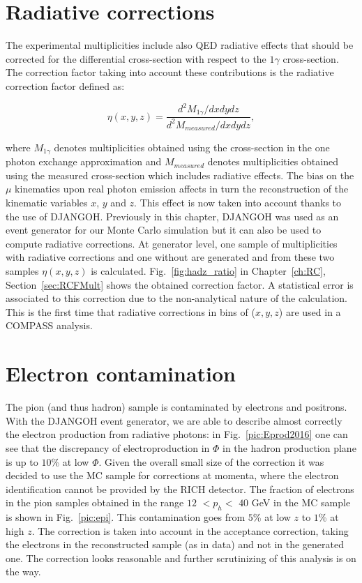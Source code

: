\section{Radiative corrections} \label{sec:rcf}

The experimental multiplicities include also QED radiative effects that should be corrected for the differential cross-section with respect to the $1\gamma$ cross-section. The correction factor taking into account these contributions is the radiative correction factor defined as:

\begin{equation}
	\eta(x,y,z) = \frac{d^2 M_{1\gamma}/dxdydz}{d^2 M_{measured}/dxdydz},
\end{equation}

where $M_{1\gamma}$ denotes multiplicities obtained using the cross-section in the one photon exchange approximation and $M_{measured}$ denotes multiplicities obtained using the measured cross-section which includes radiative effects. The bias on the $\mu$ kinematics upon real photon emission affects in turn the reconstruction of the kinematic variables $x$, $y$ and $z$. This effect is now taken into account thanks to the use of DJANGOH. Previously in this chapter, DJANGOH was used as an event generator for our Monte Carlo simulation but it can also be used to compute radiative corrections. At generator level, one sample of multiplicities with radiative corrections and one without are generated and from these two samples $\eta(x,y,z)$ is calculated. Fig.~\ref{fig:hadz_ratio} in Chapter~\ref{ch:RC}, Section~\ref{sec:RCFMult} shows the obtained correction factor. A statistical error is associated to this correction due to the non-analytical nature of the calculation. This is the first time that radiative corrections in bins of ($x,y,z$) are used in a COMPASS analysis.

\section{Electron contamination}

The pion (and thus hadron) sample is contaminated by electrons and positrons. With the DJANGOH event generator, we are able to describe almost correctly the electron production from radiative photons: in Fig.~\ref{pic:Eprod2016} one can see that the discrepancy of electroproduction in $\Phi$ in the hadron production plane is up to $10$\% at low $\Phi$. Given the overall small size of the correction it was decided to use the MC sample for corrections at momenta, where the electron identification cannot be provided by the RICH detector. The fraction of electrons in the pion samples obtained in the range $12$ $< p_h <$ $40$ GeV in the MC sample is shown in Fig.~\ref{pic:epi}. This contamination goes from $5$\% at low $z$ to $1$\% at high $z$. The correction is taken into account in the acceptance correction, taking the electrons in the reconstructed sample (as in data) and not in the generated one. The correction looks reasonable and further scrutinizing of this analysis is on the way.


